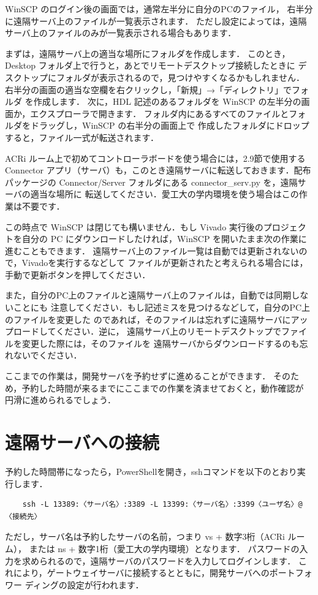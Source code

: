 WinSCP のログイン後の画面では，通常左半分に自分のPCのファイル，
右半分に遠隔サーバ上のファイルが一覧表示されます．
ただし設定によっては，遠隔サーバ上のファイルのみが一覧表示される場合もあります．

まずは，遠隔サーバ上の適当な場所にフォルダを作成します．
このとき，Desktop フォルダ上で行うと，あとでリモートデスクトップ接続したときに
デスクトップにフォルダが表示されるので，見つけやすくなるかもしれません．
右半分の画面の適当な空欄を右クリックし，「新規」→「ディレクトリ」でフォルダ
を作成します．
次に，HDL 記述のあるフォルダを WinSCP の左半分の画面か，エクスプローラで開きます． 
フォルダ内にあるすべてのファイルとフォルダをドラッグし，WinSCP の右半分の画面上で
作成したフォルダにドロップすると，ファイル一式が転送されます．

ACRi ルーム上で初めてコントローラボードを使う場合には，2.9節で使用する Connector
アプリ（サーバ）も，このとき遠隔サーバに転送しておきます．配布パッケージの
Connector/Server フォルダにある connector\_serv.py を，遠隔サーバの適当な場所に
転送してください．愛工大の学内環境を使う場合はこの作業は不要です．

この時点で WinSCP は閉じても構いません．もし Vivado 実行後のプロジェクトを自分の
PC にダウンロードしたければ，WinSCP を開いたまま次の作業に進むこともできます．
遠隔サーバ上のファイル一覧は自動では更新されないので，Vivadoを実行するなどして
ファイルが更新されたと考えられる場合には，手動で更新ボタンを押してください．

また，自分のPC上のファイルと遠隔サーバ上のファイルは，自動では同期しないことにも
注意してください．もし記述ミスを見つけるなどして，自分のPC上のファイルを変更した
のであれば，そのファイルは忘れずに遠隔サーバにアップロードしてください．逆に，
遠隔サーバ上のリモートデスクトップでファイルを変更した際には，そのファイルを
遠隔サーバからダウンロードするのも忘れないでください．

ここまでの作業は，開発サーバを予約せずに進めることができます．
そのため，予約した時間が来るまでにここまでの作業を済ませておくと，動作確認が
円滑に進められるでしょう．

\section{遠隔サーバへの接続}

予約した時間帯になったら，PowerShellを開き，sshコマンドを以下のとおり実行します．
\begin{verbatim}
    ssh -L 13389:〈サーバ名〉:3389 -L 13399:〈サーバ名〉:3399〈ユーザ名〉@〈接続先〉
\end{verbatim}
ただし，サーバ名は予約したサーバの名前，つまり vs + 数字3桁（ACRi ルーム），
または ns + 数字1桁（愛工大の学内環境）となります．
パスワードの入力を求められるので，遠隔サーバのパスワードを入力してログインします．
これにより，ゲートウェイサーバに接続するとともに，開発サーバへのポートフォワー
ディングの設定が行われます．

